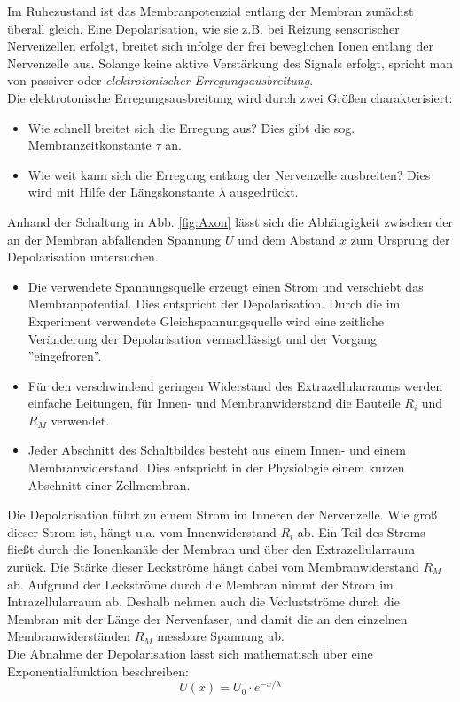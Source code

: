 \noindent
Im Ruhezustand ist das Membranpotenzial entlang der Membran zunächst überall gleich. Eine Depolarisation, wie sie z.B. bei Reizung sensorischer Nervenzellen erfolgt, breitet sich infolge der frei beweglichen Ionen entlang der Nervenzelle aus. Solange keine aktive Verstärkung des Signals erfolgt, spricht man von passiver oder \textit{elektrotonischer Erregungsausbreitung}.\\
Die elektrotonische Erregungsausbreitung wird durch zwei Größen charakterisiert:
\begin{itemize}
	\item Wie schnell breitet sich die Erregung aus? Dies gibt die sog. Membranzeitkonstante $\tau$ an.
	\item Wie weit kann sich die Erregung entlang der Nervenzelle ausbreiten? Dies wird mit Hilfe der Längskonstante $\lambda$ ausgedrückt.
\end{itemize}
%
Anhand der Schaltung in Abb. \ref{fig:Axon} lässt sich die Abhängigkeit zwischen der an der Membran abfallenden Spannung $U$ und dem Abstand $x$ zum Ursprung der Depolarisation untersuchen.
\begin{itemize}
	\item Die verwendete Spannungsquelle erzeugt einen Strom und verschiebt das Membranpotential. Dies entspricht der Depolarisation. Durch die im Experiment verwendete Gleichspannungsquelle wird eine zeitliche Veränderung der Depolarisation vernachlässigt und der Vorgang ''eingefroren''.
	\item Für den verschwindend geringen Widerstand des Extrazellularraums werden einfache Leitungen, für Innen- und Membranwiderstand die Bauteile $R_i$ und $R_M$ verwendet.
	\item Jeder Abschnitt des Schaltbildes besteht aus einem Innen- und einem Membranwiderstand. Dies entspricht in der Physiologie einem kurzen Abschnitt einer Zellmembran.
\end{itemize}
%
Die Depolarisation führt zu einem Strom im Inneren der Nervenzelle. Wie groß dieser Strom ist, hängt u.a. vom Innenwiderstand $R_i$ ab. Ein Teil des Stroms fließt durch die Ionenkanäle der Membran und über den Extrazellularraum zurück. Die Stärke dieser Leckströme hängt dabei vom Membranwiderstand $R_M$ ab. Aufgrund der Leckströme durch die Membran nimmt der Strom im Intrazellularraum ab. Deshalb nehmen auch die Verlustströme durch die Membran mit der Länge der Nervenfaser, und damit die an den einzelnen Membranwiderständen $R_M$ messbare Spannung ab.\\
Die Abnahme der Depolarisation lässt sich mathematisch über eine Exponentialfunktion beschreiben:
\begin{equation}
	U(x) = U_0\cdot e^{-x/\lambda}
\end{equation}

